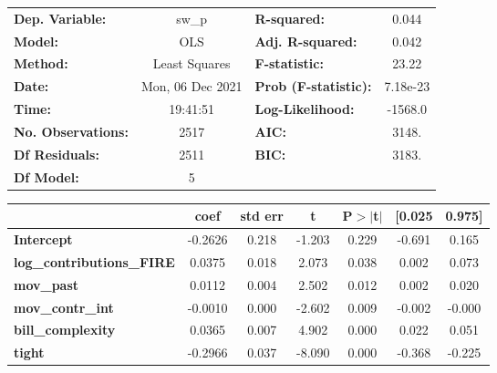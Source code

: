 \begin{center}
\begin{tabular}{lclc}
\toprule
\textbf{Dep. Variable:}           &      sw\_p       & \textbf{  R-squared:         } &     0.044   \\
\textbf{Model:}                   &       OLS        & \textbf{  Adj. R-squared:    } &     0.042   \\
\textbf{Method:}                  &  Least Squares   & \textbf{  F-statistic:       } &     23.22   \\
\textbf{Date:}                    & Mon, 06 Dec 2021 & \textbf{  Prob (F-statistic):} &  7.18e-23   \\
\textbf{Time:}                    &     19:41:51     & \textbf{  Log-Likelihood:    } &   -1568.0   \\
\textbf{No. Observations:}        &        2517      & \textbf{  AIC:               } &     3148.   \\
\textbf{Df Residuals:}            &        2511      & \textbf{  BIC:               } &     3183.   \\
\textbf{Df Model:}                &           5      & \textbf{                     } &             \\
\bottomrule
\end{tabular}
\begin{tabular}{lcccccc}
                                  & \textbf{coef} & \textbf{std err} & \textbf{t} & \textbf{P$> |$t$|$} & \textbf{[0.025} & \textbf{0.975]}  \\
\midrule
\textbf{Intercept}                &      -0.2626  &        0.218     &    -1.203  &         0.229        &       -0.691    &        0.165     \\
\textbf{log\_contributions\_FIRE} &       0.0375  &        0.018     &     2.073  &         0.038        &        0.002    &        0.073     \\
\textbf{mov\_past}                &       0.0112  &        0.004     &     2.502  &         0.012        &        0.002    &        0.020     \\
\textbf{mov\_contr\_int}          &      -0.0010  &        0.000     &    -2.602  &         0.009        &       -0.002    &       -0.000     \\
\textbf{bill\_complexity}         &       0.0365  &        0.007     &     4.902  &         0.000        &        0.022    &        0.051     \\
\textbf{tight}                    &      -0.2966  &        0.037     &    -8.090  &         0.000        &       -0.368    &       -0.225     \\

\end{tabular}
\end{center}
